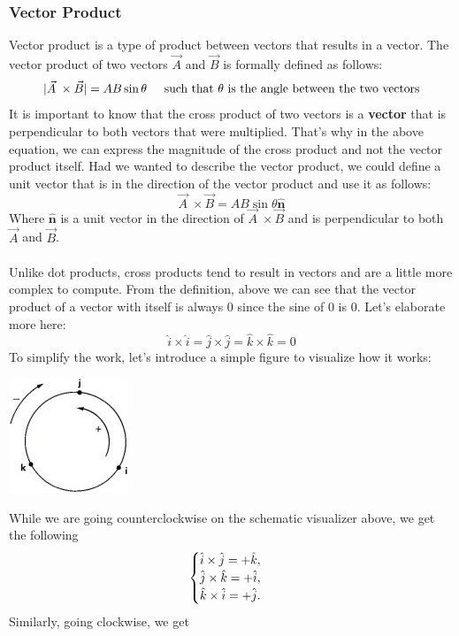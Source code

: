 \documentclass[9pt]{article}
\begin{document}
\subsubsection*{Vector Product}
Vector product is a type of product between vectors that results in a vector. The vector product of two vectors $\vec{A}$ and $\vec{B}$ is formally defined as follows:
$$|\vec{A}\; \times \vec{B}| = AB \sin \theta\hspace{0.2in}\text{such that }\theta\text{ is the angle between the two vectors}$$
It is important to know that the cross product of two vectors is a \textbf{vector} that is perpendicular to both vectors that were multiplied. That's why in the above equation, we can express the magnitude of the cross product and not the vector product itself. Had we wanted to describe the vector product, we could define a unit vector that is in the direction of the vector product and use it as follows:
$$\vec{A}\; \times \vec{B}= AB\sin\theta\hat{\textbf{n}}$$
Where $\hat{\textbf{n}}$ is a unit vector in the direction of $\vec{A}\; \times \vec{B}$ and is perpendicular to both $\vec{A}$ and $\vec{B}$. \\ \\
Unlike dot products, cross products tend to result in vectors and are a little more complex to compute. From the definition, above we can see that the vector product of a vector with itself is always 0 since the sine of 0 is 0. Let's elaborate more here:
$$\hat{i} \times \hat{i} = \hat{j} \times \hat{j} = \hat{k} \times \hat{k} = 0 $$
To simplify the work, let's introduce a simple figure to visualize how it works:
\begin{center}
	\includegraphics[scale=1.2]{cross_product_circle}
\end{center}
While we are going counterclockwise on the schematic visualizer above, we get the following
$$\begin{cases} \hat{i} \times \hat{j} = + \hat{k}, \\ \hat{j} \times \hat{k} = + \hat{i}, \\ \hat{k} \times \hat{i} = + \hat{j} \ldotp \end{cases}$$
Similarly, going clockwise, we get
\end{document}

